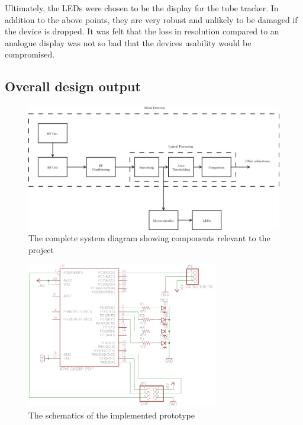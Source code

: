 \documentclass[a4paper]{article}
\begin{document}
        Ultimately, the LEDs were chosen to be the display for the tube tracker. In addition to the above points, they are very robust and unlikely to be damaged if the device is dropped. It was felt that the loss in resolution compared to an analogue display was not so bad that the devices usability would be compromised.

        \subsection{Overall design output}
        \begin{figure}[h]
            \centering
            \includegraphics[width=\textwidth]{images/complete.png}
            \caption{The complete system diagram showing components relevant to the project}
        \end{figure}
        
        \begin{figure}[h]
            \centering
            \includegraphics[width=0.75\textwidth]{images/schematic}
            \caption{The schematics of the implemented prototype}
        \end{figure}
\end{document}
